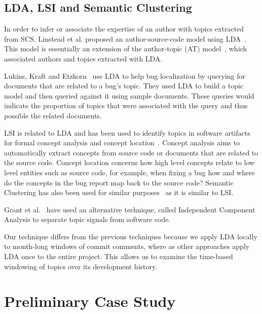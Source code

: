 \documentclass[times, 10pt,twocolumn]{article}
\begin{document}
\subsection{LDA, LSI and Semantic Clustering}

In order to infer or associate the expertise of an author with topics
extracted from SCS, Linstead et al. proposed an author-source-code model
using LDA~\cite{10.1109/MSR.2007.20,NIPS2007637,1321709}. This model
is essentially an extension of the author-topic (AT)
model~\cite{1036902}, which associated authors and topics extracted
with LDA.

Lukins, Kraft and Etzkorn~\cite{lukins2008} use LDA to help bug
localization by querying for documents that are related to a bug's topic. They
used LDA to build a topic model and then queried against it using
sample documents. These queries would indicate the proportion of
topics that were associated with the query and thus possible the
related documents.

LSI is related to LDA and has been used to identify topics in software
artifacts for formal concept analysis and concept
location~\cite{1421013,1374321,10.1109/ICPC.2007.13,10.1109/ICPC.2006.17}.
Concept analysis aims to automatically extract concepts from source
code or documents that are related to the source code.  Concept location concerns how
high level concepts relate to low level entities such as source code, for
example, when fixing a bug how and where do the concepts in the bug
report map back to the source code?  Semantic Clustering has also been
used for similar purposes~\cite{1698774,1566153} as it is similar to
LSI.

Grant et al.~\cite{scottcordy} have used an alternative technique,
 called Independent Component Analysis to
separate topic signals from software code. 

Our technique differs from the previous techniques because we apply
LDA locally to month-long windows of commit comments, where as other
approaches apply LDA once to the entire project. This allows us to
examine the time-based windowing of topics over its development
history.




\section{Preliminary Case Study}
\end{document}
